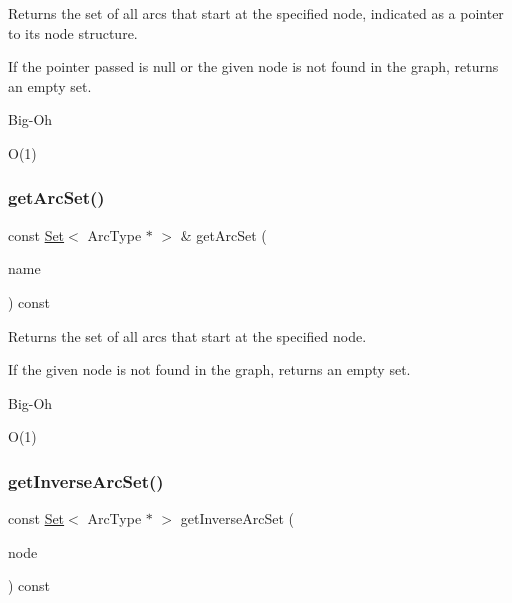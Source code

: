 Returns the set of all arcs that start at the specified node, indicated as a pointer to its node structure. 

If the pointer passed is null or the given node is not found in the graph, returns an empty set. \begin{DoxyRefDesc}{Big-\/\+Oh}
\item[\mbox{\hyperlink{BigOh__BigOh000063}{Big-\/\+Oh}}]O(1) \end{DoxyRefDesc}
\mbox{\label{classGraph_a31b9e2056ee2d66a7ea9feb02f016e8d}} 
\subsubsection{\texorpdfstring{get\+Arc\+Set()}{getArcSet()}\hspace{0.1cm}{\footnotesize\ttfamily [3/3]}}
{\footnotesize\ttfamily const \mbox{\hyperlink{classSet}{Set}}$<$ Arc\+Type $\ast$ $>$ \& get\+Arc\+Set (\begin{DoxyParamCaption}\item[{const std\+::string \&}]{name }\end{DoxyParamCaption}) const}



Returns the set of all arcs that start at the specified node. 

If the given node is not found in the graph, returns an empty set. \begin{DoxyRefDesc}{Big-\/\+Oh}
\item[\mbox{\hyperlink{BigOh__BigOh000064}{Big-\/\+Oh}}]O(1) \end{DoxyRefDesc}
\mbox{\label{classGraph_ad5fd149800cd46aae497b05b46059b63}} 
\subsubsection{\texorpdfstring{get\+Inverse\+Arc\+Set()}{getInverseArcSet()}\hspace{0.1cm}{\footnotesize\ttfamily [1/2]}}
{\footnotesize\ttfamily const \mbox{\hyperlink{classSet}{Set}}$<$ Arc\+Type $\ast$ $>$ get\+Inverse\+Arc\+Set (\begin{DoxyParamCaption}\item[{Node\+Type $\ast$}]{node }\end{DoxyParamCaption}) const}



